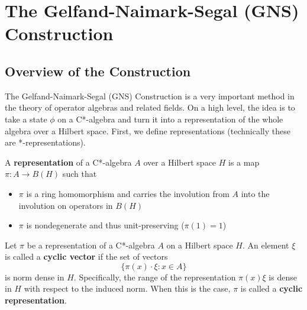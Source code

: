 \section{The Gelfand-Naimark-Segal (GNS) Construction}
\subsection{Overview of the Construction}
The Gelfand-Naimark-Segal (GNS) Construction is a very important method in the
theory of operator algebras and related fields. On a high level, the idea is to 
take a state $\phi$ on a C*-algebra and turn it into a representation of the whole
algebra over a Hilbert space. First, we define representations (technically these
are *-representations).
\begin{definition}
    A \textbf{representation} of a C*-algebra $A$ over a Hilbert space $H$ is a map
    $\pi: A \to B(H)$ such that
    \begin{itemize}
        \item $\pi$ is a ring homomorphism and carries the involution from $A$
        into the involution on operators in $B(H)$
        \item $\pi$ is nondegenerate and thus unit-preserving ($\pi(1) = 1$)
    \end{itemize}
\end{definition}

\begin{definition}
    Let $\pi$ be a representation of a C*-algebra $A$ on a Hilbert space $H$. An
    element $\xi$ is called a \textbf{cyclic vector} if the set of vectors
    \begin{equation}
        \{ \pi(x) \cdot \xi : x \in A \}
    \end{equation}
    is norm dense in $H$. Specifically, the range of the representation $\pi(x) \xi$
    is dense in $H$ with respect to the induced norm. When this is the case, $\pi$ is called a \textbf{cyclic representation}.
\end{definition}


